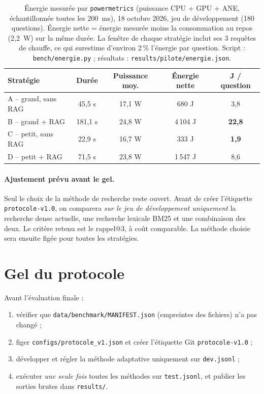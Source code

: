 \documentclass[11pt,a4paper]{article}
\begin{document}
\begin{table}[H]
\centering\small
\begin{tabular}{l c c c c}
\toprule
\textbf{Stratégie} & \textbf{Durée} & \textbf{Puissance moy.} & \textbf{Énergie nette} & \textbf{J / question} \\
\midrule
A -- grand, sans RAG & 45,5 s  & 17,1 W & 680 J   & 3,8 \\
B -- grand + RAG     & 181,1 s & 24,8 W & 4\,104 J & \textbf{22,8} \\
C -- petit, sans RAG & 22,9 s  & 16,7 W & 333 J   & \textbf{1,9} \\
D -- petit + RAG     & 71,5 s  & 23,8 W & 1\,547 J & 8,6 \\
\bottomrule
\end{tabular}
\caption{Énergie mesurée par \texttt{powermetrics} (puissance CPU + GPU + ANE, échantillonnée toutes
les 200~ms), 18 octobre 2026, jeu de développement (180 questions). Énergie nette = énergie mesurée
moins la consommation au repos (2,2~W) sur la même durée. La fenêtre de chaque stratégie inclut ses
3 requêtes de chauffe, ce qui surestime d'environ 2\,\% l'énergie par question. Script :
\texttt{bench/energie.py} ; résultats : \texttt{results/pilote/energie.json}.}
\label{tab:energie}
\end{table}

\paragraph{Ajustement prévu avant le gel.} Seul le choix de la méthode de recherche reste ouvert. Avant
de créer l'étiquette \texttt{protocole-v1.0}, on comparera \emph{sur le jeu de développement
uniquement} la recherche dense actuelle, une recherche lexicale BM25 et une combinaison des deux.
Le critère retenu est le rappel@3, à coût comparable. La méthode choisie sera ensuite figée pour
toutes les stratégies.

\section{Gel du protocole}\label{sec:gel}

Avant l'évaluation finale :
\begin{enumerate}
\item vérifier que \texttt{data/benchmark/MANIFEST.json} (empreintes des fichiers) n'a pas changé ;
\item figer \texttt{configs/protocole\_v1.json} et créer l'étiquette Git \texttt{protocole-v1.0} ;
\item développer et régler la méthode adaptative uniquement sur \texttt{dev.jsonl} ;
\item exécuter \emph{une seule fois} toutes les méthodes sur \texttt{test.jsonl}, et publier les
sorties brutes dans \texttt{results/}.
\end{enumerate}
\end{document}
